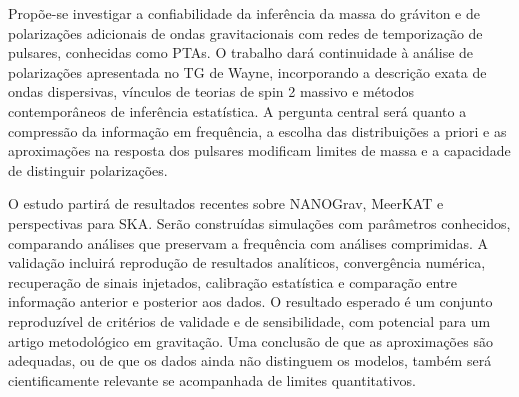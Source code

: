 Propõe-se investigar a confiabilidade da inferência da massa do gráviton
e de polarizações adicionais de ondas gravitacionais com redes de
temporização de pulsares, conhecidas como PTAs. O trabalho dará
continuidade à análise de polarizações apresentada no TG de Wayne,
incorporando a descrição exata de ondas dispersivas, vínculos de teorias
de spin 2 massivo e métodos contemporâneos de inferência estatística. A
pergunta central será quanto a compressão da informação em frequência, a
escolha das distribuições a priori e as aproximações na resposta dos
pulsares modificam limites de massa e a capacidade de distinguir
polarizações.

O estudo partirá de resultados recentes sobre NANOGrav, MeerKAT e
perspectivas para SKA. Serão construídas simulações com parâmetros
conhecidos, comparando análises que preservam a frequência com análises
comprimidas. A validação incluirá reprodução de resultados analíticos,
convergência numérica, recuperação de sinais injetados, calibração
estatística e comparação entre informação anterior e posterior aos
dados. O resultado esperado é um conjunto reproduzível de critérios de
validade e de sensibilidade, com potencial para um artigo metodológico
em gravitação. Uma conclusão de que as aproximações são adequadas, ou de
que os dados ainda não distinguem os modelos, também será
cientificamente relevante se acompanhada de limites quantitativos.
